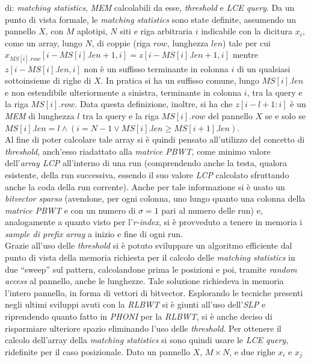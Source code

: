 \documentclass[a4paper,11pt, oneside]{article}
\begin{document}
di: \textit{matching statistics}, \textit{MEM} 
calcolabili da esse, \textit{threshold} e \textit{LCE query}. Da un punto
di vista formale, le \textit{matching statistics}
sono state definite, assumendo un pannello $X$, con $M$ aplotipi, $N$ siti e
riga arbitraria $i$ indicabile con la dicitura $x_i$, come un array, lungo $N$,
di 
coppie (riga $row$, lunghezza $len$) tale per cui
$x_{MS[i].row}[i-MS[i].len+1,i]=z[i-MS[i].len+1,i]$ mentre $z[i-MS[i].len,i]$
non è un suffisso terminante in colonna $i$ di un qualsiasi sottoinsieme di
righe di $X$. In pratica si ha un suffisso comune, lungo $MS[i].len$ e non
estendibile ulteriormente a sinistra, terminante in
colonna $i$, tra la query e la riga $MS[i].row$. Data questa definizione,
inoltre, si ha che $z[i-l+1:i]$ 
è un \textit{MEM} di lunghezza $l$ tra la query e la riga $MS[i].row$ del
pannello $X$ se e solo se  $MS[i].len=l\land(i=N-1\lor MS[i].len\geq
MS[i+1].len)$.\\ 
Al fine di poter calcolare tale array si è quindi pensato all'utilizzo del
concetto di \textit{threshold}, anch'esso riadattato alla \textit{matrice PBWT},
come minimo valore dell'\textit{array LCP} all'interno di una run (comprendendo
anche la testa, qualora esistente, della run successiva, essendo il suo valore
\textit{LCP} calcolato sfruttando anche la coda della run corrente). Anche per
tale informazione si è usato un \textit{bitvector sparso} (avendone, per ogni
colonna, uno lungo quanto una colonna della \textit{matrice PBWT} e con un
numero di $\sigma=1$ pari al numero delle run) e, analogamente a
quanto visto per l'\textit{r-index}, si è provveduto a 
tenere in memoria i \textit{sample di prefix array} a inizio e fine di ogni
run.\\ 
Grazie all'uso delle \textit{threshold} si è potuto sviluppare un algoritmo
efficiente dal punto di vista della memoria richiesta per il calcolo delle
\textit{matching statistics} in due ``sweep'' sul pattern, calcolandone prima le
posizioni e 
poi, tramite \textit{random access} al pannello, anche le
lunghezze. Tale soluzione richiedeva in memoria
l'intero pannello, in forma di vettori di
bitvector. Esplorando le tecniche presenti negli ultimi sviluppi avuti con la
\textit{RLBWT} si è giunti all'uso 
dell'\textit{SLP} e riprendendo quanto fatto in \textit{PHONI} per
la \textit{RLBWT}, si è anche deciso di risparmiare ulteriore spazio eliminando
l'uso delle \textit{threshold}. Per ottenere il calcolo dell'array della
\textit{matching 
  statistics} si sono quindi usare le \textit{LCE query}, ridefinite per il
caso posizionale. Dato un pannello $X$, $M\times N$, e due righe $x_i$ e $x_j$
\end{document}
